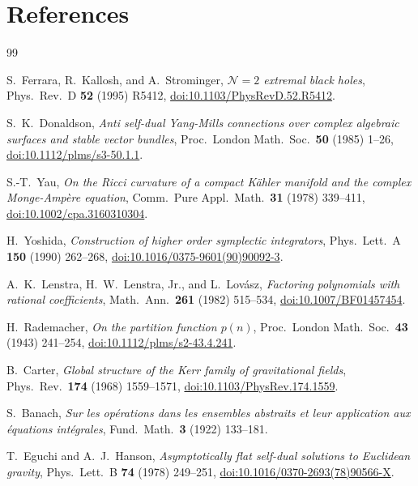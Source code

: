 \documentclass[11pt,a4paper]{article}
\begin{document}
\section*{References}
\begin{thebibliography}{99}

S.~Ferrara, R.~Kallosh, and A.~Strominger,
\emph{$\mathcal{N}=2$ extremal black holes},
Phys.\ Rev.\ D \textbf{52} (1995) R5412,
\href{https://doi.org/10.1103/PhysRevD.52.R5412}{doi:10.1103/PhysRevD.52.R5412}.

S.~K.~Donaldson,
\emph{Anti self-dual Yang-Mills connections over complex algebraic surfaces and stable vector bundles},
Proc.\ London Math.\ Soc.\ \textbf{50} (1985) 1--26,
\href{https://doi.org/10.1112/plms/s3-50.1.1}{doi:10.1112/plms/s3-50.1.1}.

S.-T.~Yau,
\emph{On the Ricci curvature of a compact K\"{a}hler manifold and the complex Monge-Amp\`ere equation},
Comm.\ Pure Appl.\ Math.\ \textbf{31} (1978) 339--411,
\href{https://doi.org/10.1002/cpa.3160310304}{doi:10.1002/cpa.3160310304}.

H.~Yoshida,
\emph{Construction of higher order symplectic integrators},
Phys.\ Lett.\ A \textbf{150} (1990) 262--268,
\href{https://doi.org/10.1016/0375-9601(90)90092-3}{doi:10.1016/0375-9601(90)90092-3}.

A.~K.~Lenstra, H.~W.~Lenstra, Jr., and L.~Lov\'{a}sz,
\emph{Factoring polynomials with rational coefficients},
Math.\ Ann.\ \textbf{261} (1982) 515--534,
\href{https://doi.org/10.1007/BF01457454}{doi:10.1007/BF01457454}.

H.~Rademacher,
\emph{On the partition function $p(n)$},
Proc.\ London Math.\ Soc.\ \textbf{43} (1943) 241--254,
\href{https://doi.org/10.1112/plms/s2-43.4.241}{doi:10.1112/plms/s2-43.4.241}.

B.~Carter,
\emph{Global structure of the Kerr family of gravitational fields},
Phys.\ Rev.\ \textbf{174} (1968) 1559--1571,
\href{https://doi.org/10.1103/PhysRev.174.1559}{doi:10.1103/PhysRev.174.1559}.

S.~Banach,
\emph{Sur les op\'{e}rations dans les ensembles abstraits et leur application aux \'{e}quations int\'{e}grales},
Fund.\ Math.\ \textbf{3} (1922) 133--181.

T.~Eguchi and A.~J.~Hanson,
\emph{Asymptotically flat self-dual solutions to Euclidean gravity},
Phys.\ Lett.\ B \textbf{74} (1978) 249--251,
\href{https://doi.org/10.1016/0370-2693(78)90566-X}{doi:10.1016/0370-2693(78)90566-X}.


\end{thebibliography}
\end{document}
